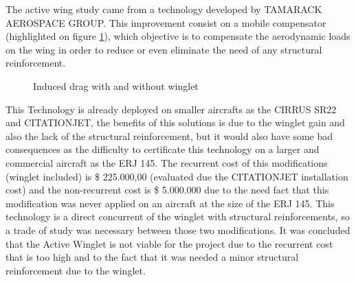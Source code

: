 The active wing study came from a technology developed by TAMARACK AEROSPACE GROUP. This improvement consist on a mobile compensator (highlighted on figure \ref{fig:ActiveWinglet}), which objective is to compensate the aerodynamic loads on the wing in order to reduce or even eliminate the need of any structural reinforcement.


\begin{figure}[H] %
\caption{Induced drag with and without winglet}
\label{fig:ActiveWinglet}
\end{figure}

This Technology is already deployed on smaller aircrafts as the CIRRUS SR22 and CITATIONJET, the benefits of this solutions is due to the winglet gain and also the lack of the structural reinforcement, but it would also have some bad consequences as the difficulty to certificate this technology on a larger and commercial aircraft as the ERJ 145.
The recurrent cost of this modifications (winglet included) is \$ 225.000,00 (evaluated due the CITATIONJET installation cost) and  the non-recurrent cost is \$ 5.000.000 due to the need fact that this modification was never applied on an aircraft at the size of the ERJ 145.
This technology is a direct concurrent of the winglet with structural reinforcements, so a trade of study was necessary between those two modifications. It was concluded that the Active Winglet is not viable for the project due to the recurrent cost that is too high and to the fact that it was needed a minor structural reinforcement due to the winglet.
